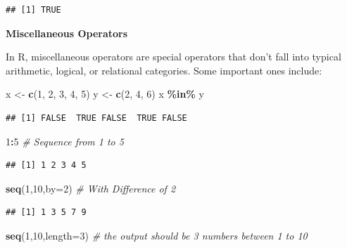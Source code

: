 \documentclass[
]{article}
\newenvironment{Shaded}{\begin{snugshade}}{\end{snugshade}}
\newcommand{\AttributeTok}[1]{\textcolor[rgb]{0.13,0.29,0.53}{#1}}
\newcommand{\CommentTok}[1]{\textcolor[rgb]{0.56,0.35,0.01}{\textit{#1}}}
\newcommand{\DecValTok}[1]{\textcolor[rgb]{0.00,0.00,0.81}{#1}}
\newcommand{\FunctionTok}[1]{\textcolor[rgb]{0.13,0.29,0.53}{\textbf{#1}}}
\newcommand{\NormalTok}[1]{#1}
\newcommand{\OtherTok}[1]{\textcolor[rgb]{0.56,0.35,0.01}{#1}}
\newcommand{\SpecialCharTok}[1]{\textcolor[rgb]{0.81,0.36,0.00}{\textbf{#1}}}
\begin{document}
\begin{verbatim}
## [1] TRUE
\end{verbatim}

\textbf{Miscellaneous Operators}

In R, miscellaneous operators are special operators that don't fall into
typical arithmetic, logical, or relational categories. Some important
ones include:

\begin{Shaded}
\begin{Highlighting}[]
\NormalTok{ x }\OtherTok{\textless{}{-}} \FunctionTok{c}\NormalTok{(}\DecValTok{1}\NormalTok{, }\DecValTok{2}\NormalTok{, }\DecValTok{3}\NormalTok{, }\DecValTok{4}\NormalTok{, }\DecValTok{5}\NormalTok{)}
\NormalTok{y }\OtherTok{\textless{}{-}} \FunctionTok{c}\NormalTok{(}\DecValTok{2}\NormalTok{, }\DecValTok{4}\NormalTok{, }\DecValTok{6}\NormalTok{)}
\NormalTok{x }\SpecialCharTok{\%in\%}\NormalTok{ y}
\end{Highlighting}
\end{Shaded}

\begin{verbatim}
## [1] FALSE  TRUE FALSE  TRUE FALSE
\end{verbatim}

\begin{Shaded}
\begin{Highlighting}[]
\DecValTok{1}\SpecialCharTok{:}\DecValTok{5} \CommentTok{\# Sequence from 1 to 5}
\end{Highlighting}
\end{Shaded}

\begin{verbatim}
## [1] 1 2 3 4 5
\end{verbatim}

\begin{Shaded}
\begin{Highlighting}[]
\FunctionTok{seq}\NormalTok{(}\DecValTok{1}\NormalTok{,}\DecValTok{10}\NormalTok{,}\AttributeTok{by=}\DecValTok{2}\NormalTok{) }\CommentTok{\# With Difference of 2}
\end{Highlighting}
\end{Shaded}

\begin{verbatim}
## [1] 1 3 5 7 9
\end{verbatim}

\begin{Shaded}
\begin{Highlighting}[]
\FunctionTok{seq}\NormalTok{(}\DecValTok{1}\NormalTok{,}\DecValTok{10}\NormalTok{,}\AttributeTok{length=}\DecValTok{3}\NormalTok{) }\CommentTok{\# the output should be 3 numbers between 1 to 10  }
\end{Highlighting}
\end{Shaded}
\end{document}
